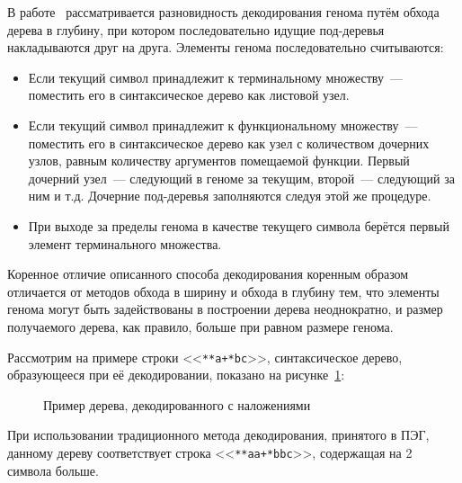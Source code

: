 В работе~\cite{conf/icnc/PengTZY05} рассматривается разновидность декодирования генома путём обхода дерева в глубину, при котором последовательно идущие под-деревья накладываются друг на друга. Элементы генома последовательно считываются:
\begin{itemize}
  \item Если текущий символ принадлежит к терминальному множеству~--- поместить его в синтаксическое дерево как листовой узел.
  \item Если текущий символ принадлежит к функциональному множеству~--- поместить его в синтаксическое дерево как узел с количеством дочерних узлов, равным количеству аргументов помещаемой функции. Первый дочерний узел~--- следующий в геноме за текущим, второй~--- следующий за ним и т.д. Дочерние под-деревья заполняются следуя этой же процедуре.
  \item При выходе за пределы генома в качестве текущего символа берётся первый элемент терминального множества.
\end{itemize}

Коренное отличие описанного способа декодирования коренным образом отличается от методов обхода в ширину и обхода в глубину тем, что элементы генома могут быть задействованы в построении дерева неоднократно, и размер получаемого дерева, как правило, больше при равном размере генома.

Рассмотрим на примере строки <<\verb|**a+*bc|>>, синтаксическое дерево, образующееся при её декодировании, показано на рисунке~\ref{img:GEP_ET_sample_EAOGE}:

\begin{figure} [h]
  \center
  \caption{Пример дерева, декодированного с наложениями}
  \label{img:GEP_ET_sample_EAOGE}
\end{figure}

При использовании традиционного метода декодирования, принятого в ПЭГ, данному дереву соответствует строка <<\verb|**aa+*bbc|>>, содержащая на 2 символа больше.

